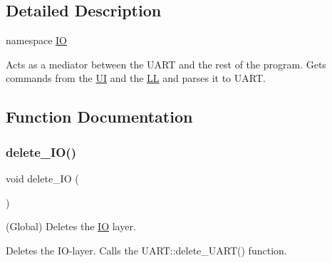\subsection{Detailed Description}
namespace \mbox{\hyperlink{namespace_i_o}{IO}} 

Acts as a mediator between the U\+A\+RT and the rest of the program. Gets commands from the \mbox{\hyperlink{namespace_u_i}{UI}} and the \mbox{\hyperlink{namespace_l_l}{LL}} and parses it to U\+A\+RT. 

\subsection{Function Documentation}
\mbox{\label{namespace_i_o_a71df3822c66f8b597b92e7e906a9d61f}} 
\subsubsection{\texorpdfstring{delete\+\_\+\+I\+O()}{delete\_IO()}}
{\footnotesize\ttfamily void delete\+\_\+\+IO (\begin{DoxyParamCaption}{ }\end{DoxyParamCaption})}



(Global) Deletes the \mbox{\hyperlink{namespace_i_o}{IO}} layer. 

Deletes the I\+O-\/layer. Calls the U\+A\+R\+T\+::delete\+\_\+\+U\+A\+R\+T() function.


